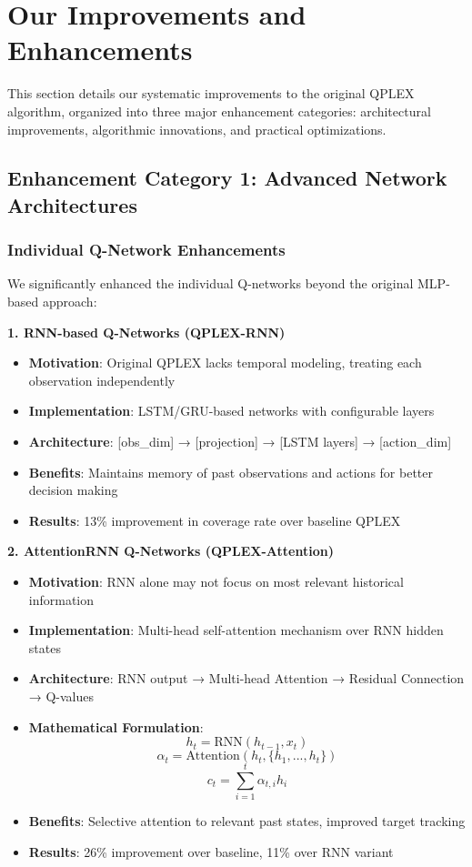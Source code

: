 \documentclass[12pt,a4paper]{report}
\begin{document}
\section{Our Improvements and Enhancements}

This section details our systematic improvements to the original QPLEX algorithm, organized into three major enhancement categories: architectural improvements, algorithmic innovations, and practical optimizations.

\subsection{Enhancement Category 1: Advanced Network Architectures}

\subsubsection{Individual Q-Network Enhancements}
We significantly enhanced the individual Q-networks beyond the original MLP-based approach:

\textbf{1. RNN-based Q-Networks (QPLEX-RNN)}
\begin{itemize}
\item \textbf{Motivation}: Original QPLEX lacks temporal modeling, treating each observation independently
\item \textbf{Implementation}: LSTM/GRU-based networks with configurable layers
\item \textbf{Architecture}: [obs\_dim] → [projection] → [LSTM layers] → [action\_dim]
\item \textbf{Benefits}: Maintains memory of past observations and actions for better decision making
\item \textbf{Results}: 13\% improvement in coverage rate over baseline QPLEX
\end{itemize}

\textbf{2. AttentionRNN Q-Networks (QPLEX-Attention)}
\begin{itemize}
\item \textbf{Motivation}: RNN alone may not focus on most relevant historical information
\item \textbf{Implementation}: Multi-head self-attention mechanism over RNN hidden states
\item \textbf{Architecture}: RNN output → Multi-head Attention → Residual Connection → Q-values
\item \textbf{Mathematical Formulation}:
$$h_t = \text{RNN}(h_{t-1}, x_t)$$
$$\alpha_t = \text{Attention}(h_t, \{h_1, ..., h_t\})$$
$$c_t = \sum_{i=1}^t \alpha_{t,i} h_i$$
\item \textbf{Benefits}: Selective attention to relevant past states, improved target tracking
\item \textbf{Results}: 26\% improvement over baseline, 11\% over RNN variant
\end{itemize}
\end{document}
